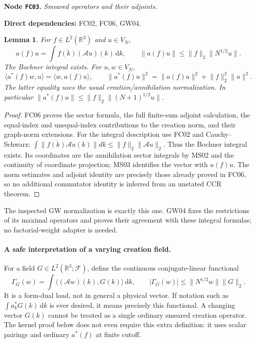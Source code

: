 \documentclass[11pt,a4paper]{article}
\newtheorem{lemma}[theorem]{Lemma}
\theoremstyle{remark}\newtheorem{remark}[theorem]{Remark}
\newcommand{\R}{\mathbb R}\newcommand{\C}{\mathbb C}\newcommand{\N}{\mathbb N}
\newcommand{\F}{\mathcal F}\newcommand{\Q}{\mathcal Q}\newcommand{\HH}{\mathcal H}
\newcommand{\ip}[2]{\langle #1,#2\rangle}\newcommand{\norm}[1]{\lVert #1\rVert}
\newcommand{\abs}[1]{\lvert #1\rvert}\newcommand{\rankone}[2]{\lvert #1\rangle\langle #2\rvert}
\newcommand{\dd}{\,\mathrm d}\newcommand{\almosteverywhere}{\text{a.e.}}
\newcommand{\node}[3]{\par\Needspace{6\baselineskip}\smallskip\hypertarget{node:#1}{}\label{nodepage:#1}\noindent\textbf{Node \texttt{#1}.} \textit{#2.}\par\noindent\textbf{Direct dependencies:} #3.\par}
\begin{document}
\node{FC03}{Smeared operators and their adjoints}{FC02, FC06, GW04}
\begin{lemma}\label{lem:smearedfield}
For $f\in L^2(\R^3)$ and $u\in V_N$,
\[
 a(f)u=\int\overline{f(k)}(\mathcal A u)(k)\dd k,
 \qquad \norm{a(f)u}\leq\norm f_2\norm{N^{1/2}u}.
\]
The Bochner integral exists. For $u,w\in V_N$,
\[
 \ip{a^*(f)w}{u}=\ip w{a(f)u},\qquad
 \norm{a^*(f)u}^2=\norm{a(f)u}^2+\norm f_2^2\norm u^2.
\]
The latter equality uses the usual creation/annihilation normalization. In particular
$\norm{a^*(f)u}\leq\norm f_2\norm{(N+1)^{1/2}u}$.
\end{lemma}
\begin{proof}
FC06 proves the sector formula, the full finite-sum adjoint calculation, the equal-index and unequal-index contributions to the creation norm, and their graph-norm extensions. For the integral description use FC02 and Cauchy--Schwarz:
$\int\|\overline{f(k)}\mathcal Au(k)\|dk\leq\|f\|_2\|\mathcal Au\|_2$.
Thus the Bochner integral exists. Its coordinates are the annihilation sector integrals by MS02 and the continuity of coordinate projection; MS03 identifies the vector with $a(f)u$. The norm estimates and adjoint identity are precisely those already proved in FC06, so no additional commutator identity is inferred from an unstated CCR theorem.
\end{proof}
The inspected GW normalization is exactly this one. GW04 fixes the restrictions of its maximal operators and proves their agreement with these integral formulas; no factorial-weight adapter is needed.

\paragraph{A safe interpretation of a varying creation field.}
For a field $G\in L^2(\R^3;\F)$, define the continuous conjugate-linear functional
\[
 \Gamma_G(w)=\int\ip{(\mathcal A w)(k)}{G(k)}\dd k,
 \qquad \abs{\Gamma_G(w)}\leq\norm{N^{1/2}w}\norm G_2.
\]
It is a form-dual load, not in general a physical vector. If notation such as
$\int a_k^*G(k)\dd k$ is ever desired, it means precisely this functional. A changing vector $G(k)$ cannot be treated as a single ordinary smeared creation operator. The kernel proof below does not even require this extra definition: it uses scalar pairings and ordinary $a^*(f)$ at finite cutoff.
\end{document}
